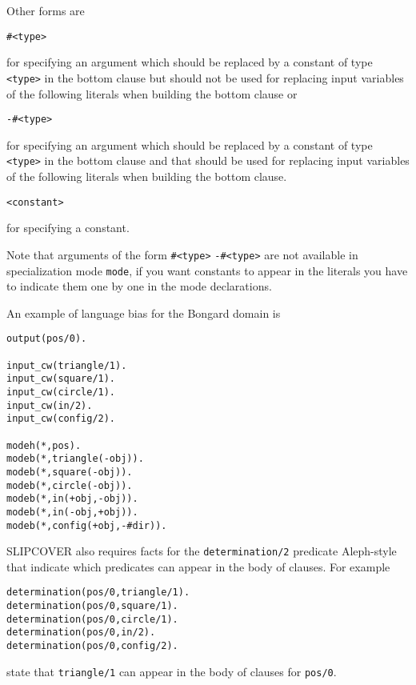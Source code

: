 Other forms are
\begin{verbatim}
#<type>
\end{verbatim}
for specifying an argument which should be replaced by a constant of type \texttt{<type>} in the bottom clause but should not be used for replacing input variables of the following literals when building the bottom clause or 
\begin{verbatim}
-#<type>
\end{verbatim}
for specifying an argument which should be replaced by a constant of type \texttt{<type>} in the bottom clause and that should be used for replacing input variables of the following literals when building the bottom clause. 
\begin{verbatim}
<constant>
\end{verbatim}
for specifying a constant.

Note that arguments of the form
\verb|#<type>| \verb|-#<type>| are not available in 
specialization mode \verb|mode|, if you want constants to appear in 
the literals you have to indicate them one by one in the mode declarations.


An example of language bias for the Bongard domain is
\begin{verbatim}
output(pos/0).

input_cw(triangle/1).
input_cw(square/1).
input_cw(circle/1).
input_cw(in/2).
input_cw(config/2).

modeh(*,pos).
modeb(*,triangle(-obj)).
modeb(*,square(-obj)).
modeb(*,circle(-obj)).
modeb(*,in(+obj,-obj)).
modeb(*,in(-obj,+obj)).
modeb(*,config(+obj,-#dir)).
\end{verbatim}
SLIPCOVER also requires facts for the \verb|determination/2| predicate  Aleph-style that indicate which predicates can appear in the body of clauses. 
For example
\begin{verbatim}
determination(pos/0,triangle/1).
determination(pos/0,square/1).
determination(pos/0,circle/1).
determination(pos/0,in/2).
determination(pos/0,config/2).
\end{verbatim}
state that \verb|triangle/1| can appear in the body of clauses for \verb|pos/0|.

